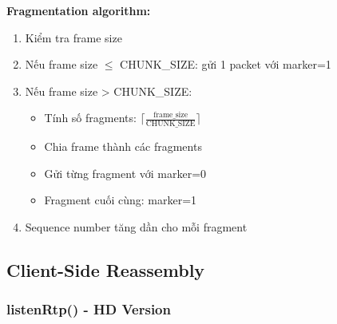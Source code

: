 \textbf{Fragmentation algorithm:}
\begin{enumerate}
    \item Kiểm tra frame size
    \item Nếu frame size $\leq$ CHUNK\_SIZE: gửi 1 packet với marker=1
    \item Nếu frame size > CHUNK\_SIZE:
    \begin{itemize}
        \item Tính số fragments: $\lceil \frac{\text{frame\_size}}{\text{CHUNK\_SIZE}} \rceil$
        \item Chia frame thành các fragments
        \item Gửi từng fragment với marker=0
        \item Fragment cuối cùng: marker=1
    \end{itemize}
    \item Sequence number tăng dần cho mỗi fragment
\end{enumerate}

\subsection{Client-Side Reassembly}

\subsubsection{listenRtp() - HD Version}

